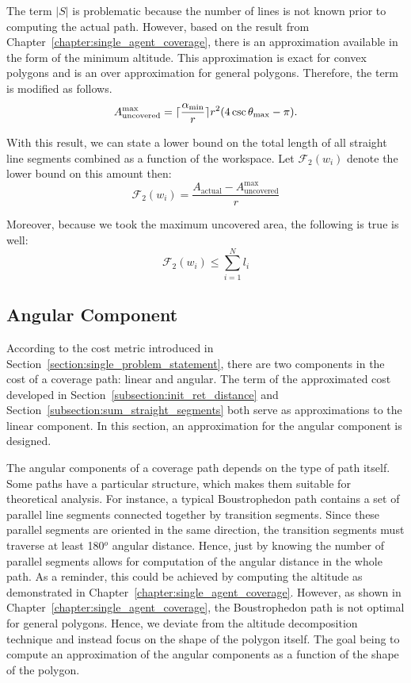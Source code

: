 \documentclass[../main.tex]{subfiles}
\begin{document}
The term $|S|$ is problematic because the number of lines is not known prior to computing the actual path. However, based on the result from Chapter~\ref{chapter:single_agent_coverage}, there is an approximation available in the form of the minimum altitude. This approximation is exact for convex polygons and is an over approximation for general polygons. Therefore, the term is modified as follows.
\begin{equation}
	A_{\text{uncovered}}^{\max}=\lceil\frac{\alpha_{\min}}{r}\rceil r^2(4\csc\theta_{\max}-\pi).
\end{equation}%



With this result, we can state a lower bound on the total length of all straight line segments combined as a function of the workspace. Let $\mathcal{F}_2(w_i)$ denote the lower bound on this amount then:
\begin{equation}
	\mathcal{F}_2(w_i)=\frac{A_{\text{actual}}-A_{\text{uncovered}}^{\max}}{r}
\end{equation}

Moreover, because we took the maximum uncovered area, the following is true is well:
\begin{equation}
	\mathcal{F}_2(w_i)\leq\sum_{i=1}^Nl_i
\end{equation}


\subsection{Angular Component}
\label{subsection:angular_component}


According to the cost metric introduced in Section~\ref{section:single_problem_statement}, there are two components in the cost of a coverage path: linear and angular. The term of the approximated cost developed in Section~\ref{subsection:init_ret_distance} and Section~\ref{subsection:sum_straight_segments} both serve as approximations to the linear component. In this section, an approximation for the angular component is designed.

The angular components of a coverage path depends on the type of path itself. Some paths have a particular structure, which makes them suitable for theoretical analysis. For instance, a typical Boustrophedon path contains a set of parallel line segments connected together by transition segments. Since these parallel segments are oriented in the same direction, the transition segments must traverse at least 180$^o$ angular distance. Hence, just by knowing the number of parallel segments allows for computation of the angular distance in the whole path. As a reminder, this could be achieved by computing the altitude as demonstrated in Chapter~\ref{chapter:single_agent_coverage}. However, as shown in Chapter~\ref{chapter:single_agent_coverage}, the Boustrophedon path is not optimal for general polygons. Hence, we deviate from the altitude decomposition technique and instead focus on the shape of the polygon itself. The goal being to compute an approximation of the angular components as a function of the shape of the polygon.
\end{document}
